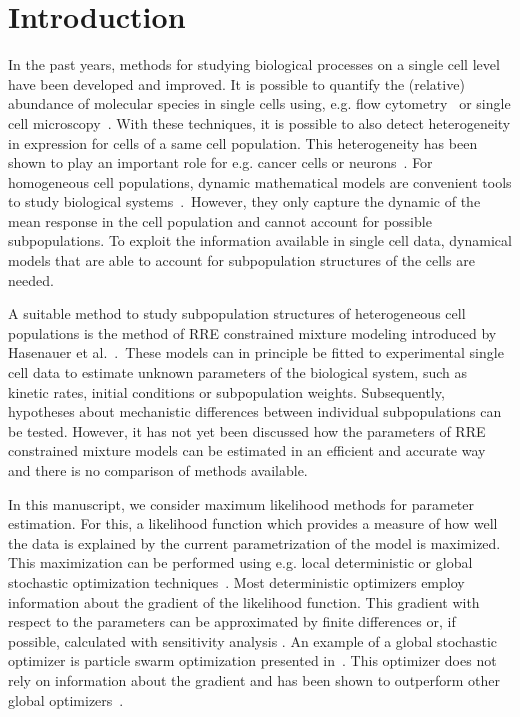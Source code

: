 \documentclass{llncs}
\begin{document}
\section{Introduction}
In the past years, methods for studying biological processes on a single cell level have been developed and improved. It is possible to quantify the (relative) abundance of molecular species in single cells using, e.g. flow cytometry~\cite{Davey1996} or single cell microscopy~\cite{Myashiro2007}. With these techniques, it is possible to also detect heterogeneity in expression for cells of a same cell population. This heterogeneity has been shown to play an important role for e.g. cancer cells or neurons~\cite{Michor2010,Torres2014}. For homogeneous cell populations, dynamic mathematical models are convenient tools to study biological systems~\cite{Kitano2002}.\color{revcol}~However, they only capture the dynamic of the mean response in the cell population and cannot account for possible subpopulations. To exploit the information available in single cell data, dynamical models that are able to account for subpopulation structures of the cells are needed.

A suitable method to study subpopulation structures of heterogeneous cell populations is the method of RRE constrained mixture modeling introduced by Hasenauer et al.~\cite{Hasenauer2014}.\color{black}~These models can in principle be fitted to experimental single cell data to estimate unknown parameters of the biological system, such as kinetic rates, initial conditions or subpopulation weights. Subsequently, hypotheses about mechanistic differences between individual subpopulations can be tested. However, it has not yet been discussed how the parameters of RRE constrained mixture models can be estimated in an efficient and accurate way and there is no comparison of methods available.

In this manuscript, we consider maximum likelihood methods for parameter estimation. For this, a likelihood function which provides a measure of how well the data is explained by the current parametrization of the model is maximized. This maximization can be performed using e.g. local deterministic or global stochastic optimization techniques~\cite{Gabor2015,Raue2013,Vaz2006}. Most deterministic optimizers employ information about the gradient of the likelihood function. This gradient with respect to the parameters can be approximated by finite differences or, if possible, calculated with sensitivity analysis \cite{Raue2013,Sengupta2014}. An example of a global stochastic optimizer is particle swarm optimization presented in~\cite{Vaz2006}. This optimizer does not rely on information about the gradient and has been shown to outperform other global optimizers~\cite{Vaz2006}.
\end{document}
